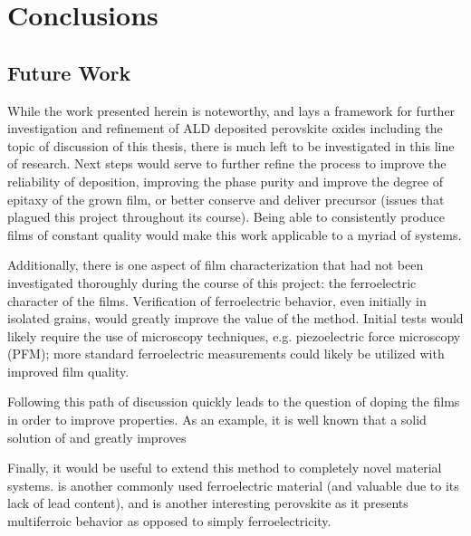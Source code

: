 \chapter{Conclusions}
\label{ch:Conc}
\thispagestyle{empty}







\section{Future Work}
\label{sec:Conc-Future}

While the work presented herein is noteworthy, and lays a framework for further investigation and refinement of ALD deposited perovskite oxides including the topic of discussion of this thesis, there is much left to be investigated in this line of research. Next steps would serve to further refine the process to improve the reliability of deposition, improving the phase purity and improve the degree of epitaxy of the grown film, or better conserve and deliver precursor (issues that plagued this project throughout its course). Being able to consistently produce films of constant quality would make this work applicable to a myriad of systems. 

Additionally, there is one aspect of film characterization that had not been investigated thoroughly during the course of this project: the ferroelectric character of the films. Verification of ferroelectric behavior, even initially in isolated grains, would greatly improve the value of the method. Initial tests would likely require the use of microscopy techniques, e.g. piezoelectric force microscopy (PFM); more standard ferroelectric measurements could likely be utilized with improved film quality. 

Following this path of discussion quickly leads to the question of doping the films in order to improve properties. As an example, it is well known  that a solid solution of  and  greatly improves  

Finally, it would be useful to extend this method to completely novel material systems.  is another commonly used ferroelectric material (and valuable due to its lack of lead content), and  is another interesting perovskite as it presents multiferroic behavior as opposed to simply ferroelectricity. 






